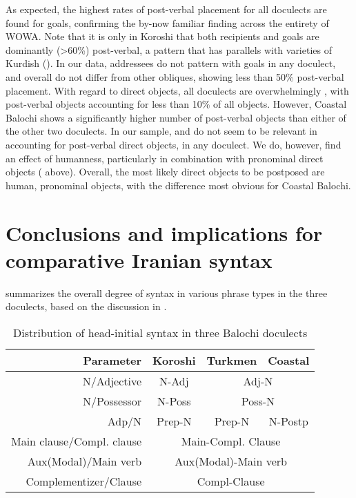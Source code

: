 \documentclass[output=paper,colorlinks,citecolor=brown,draftmode]{langscibook}
\begin{document}
As expected, the highest rates of post-verbal placement for all doculects are found for goals, confirming the by-now familiar finding across the entirety of WOWA. Note that it is only in Koroshi that both recipients and goals are dominantly (>60\%) post-verbal, a pattern that has parallels with varieties of Kurdish (\citealt{haig_kurdish_2022}). In our data, addressees do not pattern with goals in any doculect, and overall do not differ from other obliques, showing less than 50\% post-verbal placement. 
With regard to direct objects, all doculects are overwhelmingly , with post-verbal objects accounting for less than 10\% of all objects. However, Coastal Balochi shows a significantly higher number of post-verbal objects than either of the other two doculects. In our sample,  and  do not seem to be relevant in accounting for post-verbal direct objects, in any doculect. We do, however, find an effect of humanness, particularly in combination with pronominal direct objects ( above). Overall, the most likely direct objects to be postposed are human, pronominal objects, with the difference most obvious for Coastal Balochi.

\section{Conclusions and implications for comparative Iranian syntax}\label{Balochi:ss:6}

 summarizes the overall degree of  syntax in various phrase types in the three doculects, based on the discussion in .

\begin{table}
    \begin{tabular}{r|c|c|c|}
    \toprule
    \hline
\strut Parameter & Koroshi & Turkmen & Coastal \\
\hline
\strut N/Adjective & N-Adj & \multicolumn{2}{c|}{Adj-N} \\ \cline{2-4}
\strut N/Possessor & N-Poss & \multicolumn{2}{c|}{Poss-N} \\ \cline{2-4}
\strut Adp/N & Prep-N & Prep-N & N-Postp \\ \cline{2-4}
\strut Main clause/Compl. clause & \multicolumn{3}{c|}{Main-Compl. Clause} \\ \cline{2-4}
\strut Aux(Modal)/Main verb & \multicolumn{3}{c|}{Aux(Modal)-Main verb} \\ \cline{2-4}
\strut Complementizer/Clause & \multicolumn{3}{c|}{Compl-Clause} \\
\hline
\bottomrule
    \end{tabular}
    \caption{Distribution of head-initial syntax in three Balochi doculects}
    \label{Balochi:tab:11}
\end{table}
\end{document}
